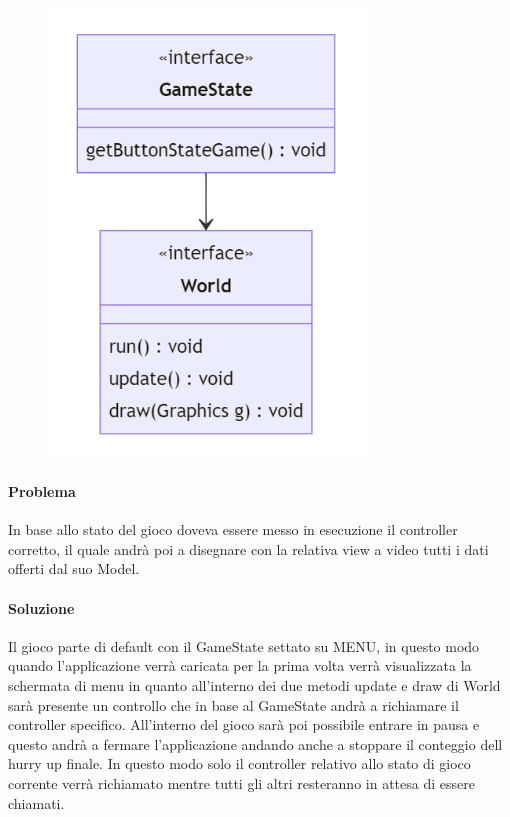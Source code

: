 \documentclass[a4paper,12pt]{report}
\begin{document}
\begin{figure}[H]
    \centering{}
    \includegraphics[width=0.75\textwidth]{img/UMLGestioneGameState.png}
    \caption{}
\end{figure}

\paragraph{Problema} In base allo stato del gioco doveva essere messo in esecuzione il controller corretto, il quale andrà poi a disegnare con la relativa view a video tutti i dati offerti dal suo Model.

\paragraph{Soluzione} Il gioco parte di default con il GameState settato su MENU, in questo modo quando l’applicazione verrà caricata per la prima volta verrà visualizzata la schermata di menu in quanto all’interno dei due metodi update e draw di World sarà presente un controllo che in base al GameState andrà a richiamare il controller specifico. All'interno del gioco sarà poi possibile entrare in  pausa e questo andrà a fermare l’applicazione andando anche a stoppare il conteggio dell hurry up finale. In questo modo solo il controller relativo allo stato di gioco corrente verrà richiamato mentre tutti gli altri resteranno in attesa di essere chiamati.
\end{document}

